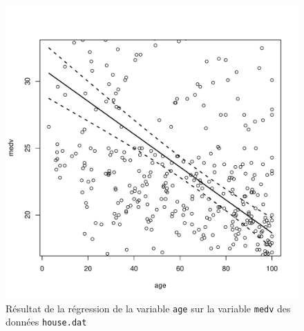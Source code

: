 \begin{solution}{2.17}
\begin{enumerate}
\begin{figure}
\begin{knitrout}
\color{fgcolor}\begin{kframe}
\begin{alltt}
 \hlkwb{<-} \hlopt{$}
 \hlopt{~}     \hlstd{=} 
\hlopt{$}
         \hlstd{=} \hlstd{,}  \hlstd{=} \hlstd{(}\hlstd{,} \hlstd{,} \hlstd{),}  \hlstd{=} \hlstd{,}
         \hlstd{=} \hlstd{,}  \hlstd{=} \hlstd{)}
\end{alltt}
\end{kframe}
\includegraphics[width=\maxwidth]{figure/unnamed-chunk-30-1}

\end{knitrout}
        \caption{Résultat de la régression de la variable \texttt{age} sur la variable \texttt{medv} des données \texttt{house.dat}}
        \label{fig:simple:house3}
      \end{figure}
    \end{enumerate}
  
\end{solution}
